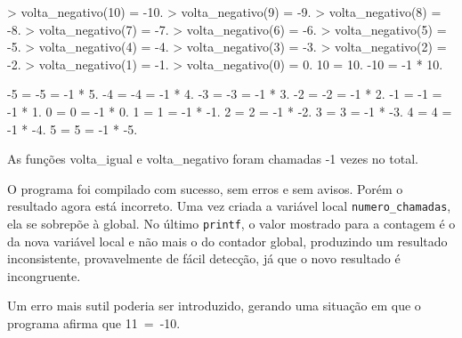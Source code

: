 \documentclass[
  11pt,
  a4paper,
]{scrbook}
\newenvironment{Shaded}{\begin{snugshade}}{\end{snugshade}}
\newcommand{\NormalTok}[1]{#1}
\begin{document}
\begin{Shaded}
\begin{Highlighting}[]
\NormalTok{\textgreater{} volta\_negativo(10) = {-}10.}
\NormalTok{\textgreater{} volta\_negativo(9) = {-}9.}
\NormalTok{\textgreater{} volta\_negativo(8) = {-}8.}
\NormalTok{\textgreater{} volta\_negativo(7) = {-}7.}
\NormalTok{\textgreater{} volta\_negativo(6) = {-}6.}
\NormalTok{\textgreater{} volta\_negativo(5) = {-}5.}
\NormalTok{\textgreater{} volta\_negativo(4) = {-}4.}
\NormalTok{\textgreater{} volta\_negativo(3) = {-}3.}
\NormalTok{\textgreater{} volta\_negativo(2) = {-}2.}
\NormalTok{\textgreater{} volta\_negativo(1) = {-}1.}
\NormalTok{\textgreater{} volta\_negativo(0) = 0.}
\NormalTok{10 = 10.}
\NormalTok{{-}10 = {-}1 * 10.}

\NormalTok{{-}5 = {-}5 = {-}1 * 5.}
\NormalTok{{-}4 = {-}4 = {-}1 * 4.}
\NormalTok{{-}3 = {-}3 = {-}1 * 3.}
\NormalTok{{-}2 = {-}2 = {-}1 * 2.}
\NormalTok{{-}1 = {-}1 = {-}1 * 1.}
\NormalTok{0 = 0 = {-}1 * 0.}
\NormalTok{1 = 1 = {-}1 * {-}1.}
\NormalTok{2 = 2 = {-}1 * {-}2.}
\NormalTok{3 = 3 = {-}1 * {-}3.}
\NormalTok{4 = 4 = {-}1 * {-}4.}
\NormalTok{5 = 5 = {-}1 * {-}5.}

\NormalTok{As funções volta\_igual e volta\_negativo foram chamadas {-}1 vezes no total.}
\end{Highlighting}
\end{Shaded}

O programa foi compilado com sucesso, sem erros e sem avisos. Porém o
resultado agora está incorreto. Uma vez criada a variável local
\texttt{numero\_chamadas}, ela se sobrepõe à global. No último
\texttt{printf}, o valor mostrado para a contagem é o da nova variável
local e não mais o do contador global, produzindo um resultado
inconsistente, provavelmente de fácil detecção, já que o novo resultado
é incongruente.

Um erro mais sutil poderia ser introduzido, gerando uma situação em que
o programa afirma que 11~=~-10.
\end{document}
